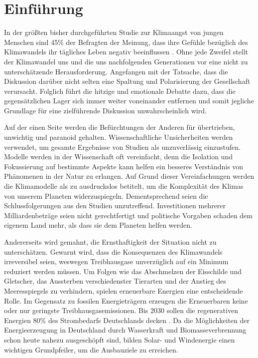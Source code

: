 \documentclass[12pt, a4paper]{article}
\begin{document}
\newpage

\tableofcontents


\newpage
\setcounter{section}{0}


\section{Einführung}


In der größten bisher durchgeführten Studie zur Klimaangst von jungen Menschen sind 45\% der Befragten der Meinung, dass ihre Gefühle bezüglich des Klimawandels ihr tägliches Leben negativ beeinflussen \cite{marks2021young}. Ohne jede Zweifel stellt der Klimawandel uns und die uns nachfolgenden Generationen vor eine nicht zu unterschätzende Herausforderung. Angefangen mit der Tatsache, dass die Diskussion darüber nicht selten eine Spaltung und Polarisierung der Gesellschaft verursacht. Folglich führt die hitzige und emotionale Debatte dazu, dass die gegensätzlichen Lager sich immer weiter voneinander entfernen und somit jegliche Grundlage für eine zielführende Diskussion unwahrscheinlich wird.

Auf der einen Seite werden die Befürchtungen der Anderen für übertrieben, unwichtig und paranoid gehalten. Wissenschaftliche Unsicherheiten werden verwendet, um gesamte Ergebnisse von Studien als unzuverlässig einzustufen. Modelle werden in der Wissenschaft oft vereinfacht, denn die Isolation und Fokussierung auf bestimmte Aspekte kann helfen ein besseres Verständnis von Phänomenen in der Natur zu erlangen. Auf Grund dieser Vereinfachungen werden die Klimamodelle als zu ausdruckslos betitelt, um die Komplexität des Klimas von unserem Planeten widerzuspiegeln. Dementsprechend seien die Schlussfolgerungen aus den Studien unzutreffend. Investitionen mehrerer Milliardenbeträge seien nicht gerechtfertigt und politische Vorgaben schaden dem eigenem Land mehr, als dass sie dem Planeten helfen werden.

Andererseits wird gemahnt, die Ernsthaftigkeit der Situation nicht zu unterschätzen. Gewarnt wird, dass die Konsequenzen des Klimawandels irreversibel seien, weswegen Treibhausgase unverzüglich auf ein Minimum reduziert werden müssen. Um Folgen wie das Abschmelzen der Eisschilde und Gletscher, das Aussterben verschiedenster Tierarten und der Anstieg des Meeresspiegels zu verhindern, spielen erneuerbare Energien eine entscheidende Rolle. Im Gegensatz zu fossilen Energieträgern erzeugen die Erneuerbaren keine oder nur geringste Treibhausgasemissionen. Bis 2030 sollen die regenerativen Energien 80\% des Strombedarfs Deutschlands decken \cite{faz2023wind}. Da die Möglichkeiten der Energieerzeugung in Deutschland durch Wasserkraft und Biomasseverbrennung schon heute nahezu ausgeschöpft sind, bilden Solar- und Windenergie einen wichtigen Grundpfeiler, um die Ausbauziele zu erreichen. 
\end{document}
